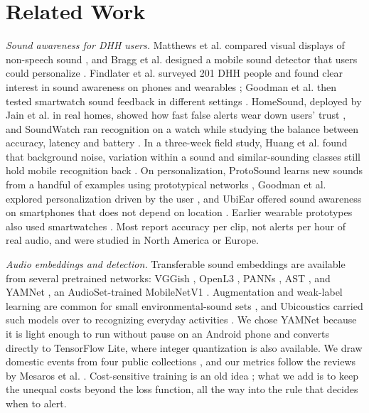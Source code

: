 \documentclass[conference,a4paper]{IEEEtran}
\begin{document}
\section{Related Work}
\textit{Sound awareness for DHH users.} Matthews et al. compared visual displays of non-speech sound \cite{matthews2006}, and Bragg et al. designed a mobile sound detector that users could personalize \cite{bragg2016}. Findlater et al. surveyed 201 DHH people and found clear interest in sound awareness on phones and wearables \cite{findlater2019}; Goodman et al. then tested smartwatch sound feedback in different settings \cite{goodman2020}. HomeSound, deployed by Jain et al. in real homes, showed how fast false alerts wear down users' trust \cite{jain2020homesound}, and SoundWatch ran recognition on a watch while studying the balance between accuracy, latency and battery \cite{jain2020soundwatch}. In a three-week field study, Huang et al. found that background noise, variation within a sound and similar-sounding classes still hold mobile recognition back \cite{huang2023}. On personalization, ProtoSound learns new sounds from a handful of examples using prototypical networks \cite{jain2022protosound,snell2017}, Goodman et al. explored personalization driven by the user \cite{goodman2021}, and UbiEar offered sound awareness on smartphones that does not depend on location \cite{liu2017ubiear}. Earlier wearable prototypes also used smartwatches \cite{mielke2015}. Most report accuracy per clip, not alerts per hour of real audio, and were studied in North America or Europe.

\textit{Audio embeddings and detection.} Transferable sound embeddings are available from several pretrained networks: VGGish \cite{hershey2017}, OpenL3 \cite{cramer2019}, PANNs \cite{kong2020}, AST \cite{gong2021}, and YAMNet \cite{yamnet}, an AudioSet-trained MobileNetV1 \cite{howard2017}. Augmentation and weak-label learning are common for small environmental-sound sets \cite{salamon2017,kumar2016}, and Ubicoustics carried such models over to recognizing everyday activities \cite{laput2018}. We chose YAMNet because it is light enough to run without pause on an Android phone and converts directly to TensorFlow Lite, where integer quantization \cite{jacob2018} is also available. We draw domestic events from four public collections \cite{fonseca2022,gemmeke2017,piczak2015,turpault2019}, and our metrics follow the reviews by Mesaros et al. \cite{mesaros2016,mesaros2021}. Cost-sensitive training is an old idea \cite{elkan2001}; what we add is to keep the unequal costs beyond the loss function, all the way into the rule that decides when to alert.
\end{document}
